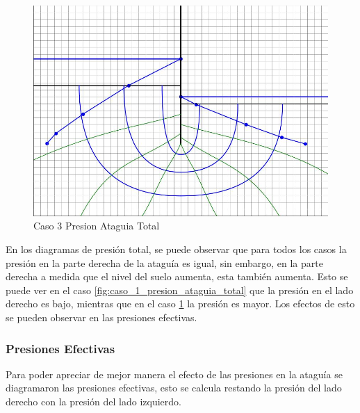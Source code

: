 \begin{figure}[H]
\begin{minipage}{0.32\textwidth}
        \centering
        \includegraphics[width=\textwidth]{GRAFICOS/caso_3_presion_ataguia_total.jpg}
        \caption{Caso 3 Presion Ataguia Total}
        \label{fig:caso_3_presion_ataguia_total}
    \end{minipage}
\end{figure}

En los diagramas de presión total, se puede observar que para todos los casos la presión en la parte derecha de la ataguía es igual, sin embargo, en la parte derecha a medida que el nivel del suelo aumenta, esta también aumenta. Esto se puede ver en el caso \ref{fig:caso_1_presion_ataguia_total} que la presión en el lado derecho es bajo, mientras que en el caso \ref{fig:caso_3_presion_ataguia_total} la presión es mayor. Los efectos de esto se pueden observar en las presiones efectivas.

\subsubsection{Presiones Efectivas}

Para poder apreciar de mejor manera el efecto de las presiones en la ataguía se diagramaron las presiones efectivas, esto se calcula restando la presión del lado derecho con la presión del lado izquierdo. 

